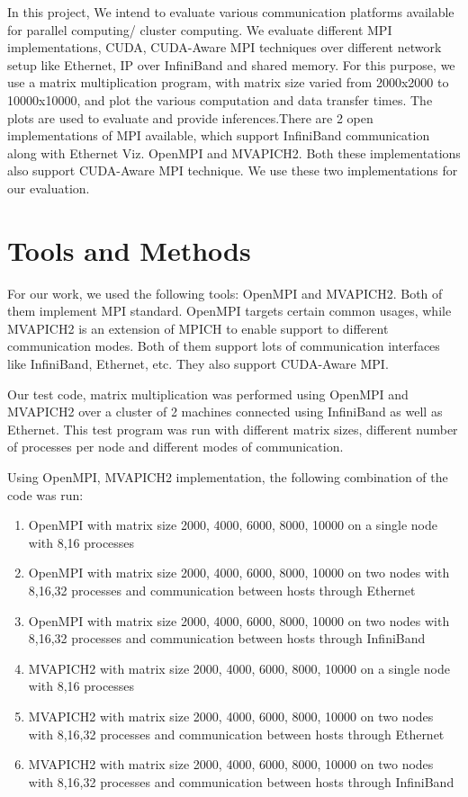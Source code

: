 \documentclass[10pt]{article}
\begin{document}
In this project, We intend to evaluate various communication platforms available for parallel computing/ cluster computing. We evaluate different MPI implementations, CUDA, CUDA-Aware MPI techniques over different network setup like Ethernet, IP over InfiniBand and shared memory. For this purpose, we use a matrix multiplication program, with matrix size varied from 2000x2000 to 10000x10000, and plot the various computation and data transfer times. The plots are used to evaluate and provide inferences.There are 2 open implementations of MPI available, which support InfiniBand communication along with Ethernet Viz. OpenMPI and MVAPICH2. Both these implementations also support CUDA-Aware MPI technique. We use these two implementations for our evaluation.


\section{Tools and Methods}
\label{methods}

For our work, we used the following tools: OpenMPI and MVAPICH2.
Both of them implement MPI standard. OpenMPI targets certain common usages, while MVAPICH2 is an extension of MPICH to enable support to different communication modes. Both of them support lots of communication interfaces like InfiniBand, Ethernet, etc. They also support CUDA-Aware MPI.






Our test code, matrix multiplication was performed using OpenMPI and MVAPICH2 over a cluster of 2 machines connected using InfiniBand as well as Ethernet. This test program was run with different matrix sizes, different number of processes per node and different modes of communication.

Using OpenMPI, MVAPICH2 implementation, the following combination of the code was run:
\begin{enumerate}
\item OpenMPI with matrix size 2000, 4000, 6000, 8000, 10000 on a single node with 8,16 processes
\item OpenMPI with matrix size 2000, 4000, 6000, 8000, 10000 on two nodes with 8,16,32 processes and communication between hosts through Ethernet
\item OpenMPI with matrix size 2000, 4000, 6000, 8000, 10000 on two nodes with 8,16,32 processes and communication between hosts through InfiniBand
\item MVAPICH2 with matrix size 2000, 4000, 6000, 8000, 10000 on a single node with 8,16 processes
\item MVAPICH2 with matrix size 2000, 4000, 6000, 8000, 10000 on two nodes with 8,16,32 processes and communication between hosts through Ethernet
\item MVAPICH2 with matrix size 2000, 4000, 6000, 8000, 10000 on two nodes with 8,16,32 processes and communication between hosts through InfiniBand
\end{enumerate}
\end{document}
